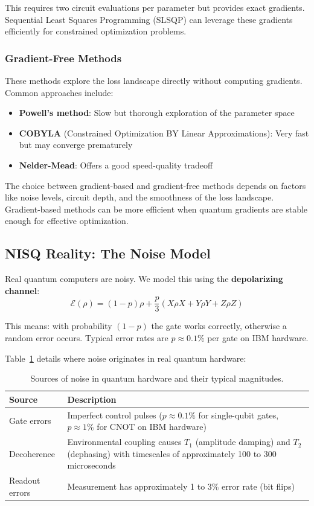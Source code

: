\documentclass[11pt,a4paper]{article}
\begin{document}
This requires two circuit evaluations per parameter but provides exact gradients. Sequential Least Squares Programming (SLSQP) can leverage these gradients efficiently for constrained optimization problems.

\subsubsection{Gradient-Free Methods}

These methods explore the loss landscape directly without computing gradients. Common approaches include:
\begin{itemize}
    \item \textbf{Powell's method}: Slow but thorough exploration of the parameter space
    \item \textbf{COBYLA} (Constrained Optimization BY Linear Approximations): Very fast but may converge prematurely
    \item \textbf{Nelder-Mead}: Offers a good speed-quality tradeoff
\end{itemize}

The choice between gradient-based and gradient-free methods depends on factors like noise levels, circuit depth, and the smoothness of the loss landscape. Gradient-based methods can be more efficient when quantum gradients are stable enough for effective optimization.

\subsection{NISQ Reality: The Noise Model}

Real quantum computers are noisy. We model this using the \textbf{depolarizing channel}:
\[
\mathcal{E}(\rho) = (1 - p)\rho + \frac{p}{3}(X\rho X + Y\rho Y + Z\rho Z)
\]

This means: with probability $(1-p)$ the gate works correctly, otherwise a random error occurs. Typical error rates are $p \approx 0.1\%$ per gate on IBM hardware.

Table~\ref{tab:noise_sources} details where noise originates in real quantum hardware:

\begin{table}[H]
\centering
\begin{tabular}{lp{10cm}}
\toprule
\textbf{Source} & \textbf{Description} \\
\midrule
Gate errors & Imperfect control pulses ($p \approx 0.1\%$ for single-qubit gates, $p \approx 1\%$ for CNOT on IBM hardware) \\
\addlinespace
Decoherence & Environmental coupling causes $T_1$ (amplitude damping) and $T_2$ (dephasing) with timescales of approximately 100 to 300 microseconds \\
\addlinespace
Readout errors & Measurement has approximately 1 to 3\% error rate (bit flips) \\
\bottomrule
\end{tabular}
\caption{Sources of noise in quantum hardware and their typical magnitudes.}
\label{tab:noise_sources}
\end{table}
\end{document}
